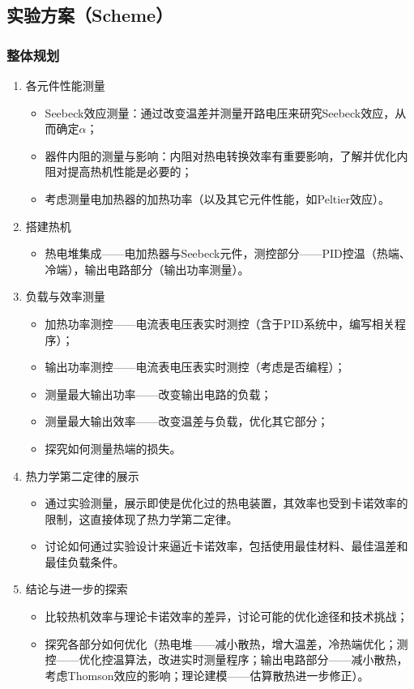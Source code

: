 \documentclass[dvipsnames, svgnames,a4paper,11pt]{article}
\begin{document}
	\subsection{实验方案（Scheme）}
	\subsubsection{整体规划}
	\begin{enumerate}
		\item 各元件性能测量
		\begin{itemize}
			\item Seebeck效应测量：通过改变温差并测量开路电压来研究Seebeck效应，从而确定$\alpha$；
			\item 器件内阻的测量与影响：内阻对热电转换效率有重要影响，了解并优化内阻对提高热机性能是必要的；
			\item 考虑测量电加热器的加热功率（以及其它元件性能，如Peltier效应）。
		\end{itemize}
		
		\item 搭建热机
		\begin{itemize}
			\item 热电堆集成——电加热器与Seebeck元件，测控部分——PID控温（热端、冷端），输出电路部分（输出功率测量）。
		\end{itemize}
		
		\item 负载与效率测量
		\begin{itemize}
			\item 加热功率测控——电流表电压表实时测控（含于PID系统中，编写相关程序）；
			\item 输出功率测控——电流表电压表实时测控（考虑是否编程）；
			\item 测量最大输出功率——改变输出电路的负载；
			\item 测量最大输出效率——改变温差与负载，优化其它部分；
			\item 探究如何测量热端的损失。
		\end{itemize}
		
		\item 热力学第二定律的展示
		\begin{itemize}
			\item 通过实验测量，展示即使是优化过的热电装置，其效率也受到卡诺效率的限制，这直接体现了热力学第二定律。
			\item 讨论如何通过实验设计来逼近卡诺效率，包括使用最佳材料、最佳温差和最佳负载条件。
		\end{itemize}			
		
		\item 结论与进一步的探索
		\begin{itemize}
			\item 比较热机效率与理论卡诺效率的差异，讨论可能的优化途径和技术挑战；
			\item 探究各部分如何优化（热电堆——减小散热，增大温差，冷热端优化；测控——优化控温算法，改进实时测量程序；输出电路部分——减小散热，考虑Thomson效应的影响；理论建模——估算散热进一步修正）。
		\end{itemize}
	\end{enumerate}
	
\end{document}
